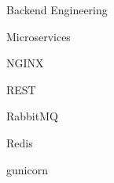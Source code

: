 \begin{skillset}{Backend Engineering}
  \item Microservices
  \item NGINX
  \item REST
  \item RabbitMQ
  \item Redis
  \item gunicorn
\end{skillset}
